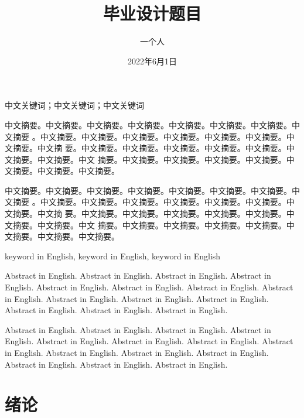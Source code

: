 \documentclass[supercite]{HustGraduPaper}
\title{毕业设计题目}
\author{一个人}
\date{2022年6月1日}
\theoremstyle{definition}
\begin{document}
\maketitle

\statement

\clearpage


\begin{cnabstract}{中文关键词；中文关键词；中文关键词}

中文摘要。中文摘要。中文摘要。中文摘要。中文摘要。中文摘要。中文摘要。中文摘要
。中文摘要。中文摘要。中文摘要。中文摘要。中文摘要。中文摘要。中文摘要。中文摘
要。中文摘要。中文摘要。中文摘要。中文摘要。中文摘要。中文摘要。中文摘要。中文
摘要。中文摘要。中文摘要。中文摘要。中文摘要。中文摘要。中文摘要。中文摘要。

中文摘要。中文摘要。中文摘要。中文摘要。中文摘要。中文摘要。中文摘要。中文摘要
。中文摘要。中文摘要。中文摘要。中文摘要。中文摘要。中文摘要。中文摘要。中文摘
要。中文摘要。中文摘要。中文摘要。中文摘要。中文摘要。中文摘要。中文摘要。中文
摘要。中文摘要。中文摘要。中文摘要。中文摘要。中文摘要。中文摘要。中文摘要。

\end{cnabstract}

\begin{enabstract}{keyword in English, keyword in English, keyword in English}

Abstract in English. Abstract in English. Abstract in English. Abstract in
English. Abstract in English. Abstract in English. Abstract in English.
Abstract in English. Abstract in English. Abstract in English. Abstract in
English. Abstract in English. Abstract in English. Abstract in English.

Abstract in English. Abstract in English. Abstract in English. Abstract in
English. Abstract in English. Abstract in English. Abstract in English.
Abstract in English. Abstract in English. Abstract in English. Abstract in
English. Abstract in English. Abstract in English. Abstract in English.

\end{enabstract}

\tableofcontents[level=2]
\clearpage


\section{绪论}
\end{document}
